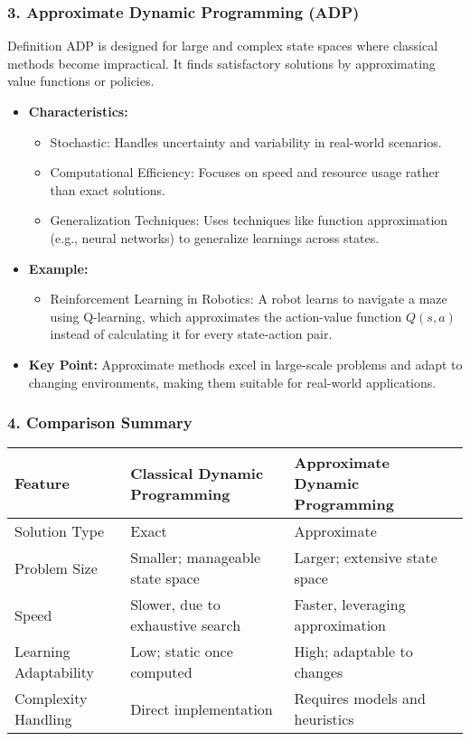 \documentclass[aspectratio=169]{beamer}
\begin{document}
\begin{frame}[fragile]
  \frametitle{3. Approximate Dynamic Programming (ADP)}
  
  \begin{block}{Definition}  
    ADP is designed for large and complex state spaces where classical methods become impractical. It finds satisfactory solutions by approximating value functions or policies.
  \end{block}

  \begin{itemize}
    \item \textbf{Characteristics:}
    \begin{itemize}
      \item Stochastic: Handles uncertainty and variability in real-world scenarios.
      \item Computational Efficiency: Focuses on speed and resource usage rather than exact solutions.
      \item Generalization Techniques: Uses techniques like function approximation (e.g., neural networks) to generalize learnings across states.
    \end{itemize}
    
    \item \textbf{Example:}
    \begin{itemize}
      \item Reinforcement Learning in Robotics: A robot learns to navigate a maze using Q-learning, which approximates the action-value function $Q(s, a)$ instead of calculating it for every state-action pair.
    \end{itemize}
    
    \item \textbf{Key Point:}
    Approximate methods excel in large-scale problems and adapt to changing environments, making them suitable for real-world applications.
  \end{itemize}
\end{frame}

\begin{frame}[fragile]
  \frametitle{4. Comparison Summary}

  \begin{tabular}{|l|l|l|}
    \hline
    \textbf{Feature} & \textbf{Classical Dynamic Programming} & \textbf{Approximate Dynamic Programming} \\
    \hline
    Solution Type & Exact & Approximate \\
    \hline
    Problem Size & Smaller; manageable state space & Larger; extensive state space \\
    \hline
    Speed & Slower, due to exhaustive search & Faster, leveraging approximation \\
    \hline
    Learning Adaptability & Low; static once computed & High; adaptable to changes \\
    \hline
    Complexity Handling & Direct implementation & Requires models and heuristics \\
    \hline
  \end{tabular}
\end{frame}
\end{document}
